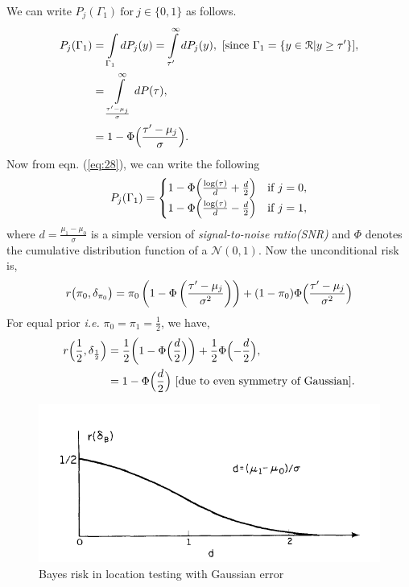 \documentclass[a4paper,english,12pt]{article}
\begin{document}
\begin{exmp}
\begin{figure}[h]
\end{figure}
We can write $P_j(\Gamma_1)~ \mbox{for}~j\in\{0,1\}$ as follows.
\begin{align}
P_{j}(\Gamma_{1})&=\int\limits_{{\Gamma_1}}  {d{P_j}(y)}
				=\int\limits_{{\tau'}}^\infty  {d{P_j}(y)},~[\mbox{since}~ \Gamma_1=\{y\in\mathcal{R}|y\geq\tau'\}],\nonumber\\
				&=\int\limits_{{\frac{\tau'-\mu_j}{\sigma}}}^\infty  {d{P}(\tau)},\nonumber\\
				&=1-\Phi\Bigl(\frac{\tau'-\mu_j}{\sigma}\Bigr).
				\end{align}
Now from eqn. (\ref{eq:28}), we can write the following
\begin{equation}
P_{j}(\Gamma_{1})= 
				  \begin{cases} 
				   1-\Phi\Bigl(\frac{\log(\tau)}{d}+\frac{d}{2}\Bigr) & \text{if }  j= 0, \\
				   1-\Phi\Bigl(\frac{\log(\tau)}{d}-\frac{d}{2}\Bigr) & \text{if }  j= 1,
				  \end{cases}
\end{equation}
where $d=\frac{\mu_{1}-\mu_{0}}{\sigma}$ is a simple version of \textit{signal-to-noise ratio(SNR)} and $\Phi$ denotes the cumulative distribution function of a $\mathcal{N}( 0, 1)$. Now the unconditional risk is,
\begin{equation}
r\bigl(\pi_0,\delta_{\pi_{0}}\bigr)=\pi_0\left(1-\Phi\left(\frac{\tau'-\mu_j}{\sigma^2}\right)\right)+(1-\pi_0)\Phi\Bigl(\frac{\tau'-\mu_j}{\sigma^2}\Bigr)\label{eq:33}
\end{equation}
For equal prior \textit{i.e.} $\pi_0=\pi_1=\frac{1}{2}$, we have,
\begin{align}
r\Bigl(\frac{1}{2},\delta_{\frac{1}{2}}\Bigr)&=\frac{1}{2}\biggl(1-\Phi\Bigl(\frac{d}{2}\Bigr)\biggr)+
												\frac{1}{2}\Phi\Bigl(-\frac{d}{2}\Bigr),\nonumber\\
											& = 1-\Phi\Bigl(\frac{d}{2}\Bigr)~\mbox{[due~to~even~symmetry~of~Gaussian]}.
\end{align}
\begin{figure}[h]
\centering
\includegraphics[width=0.6\linewidth]{Figures/Gauss_Bayes}
\caption{Bayes risk in location testing with Gaussian error}
\label{fig:bayeserror}
\end{figure}

\end{exmp}
\end{document}
